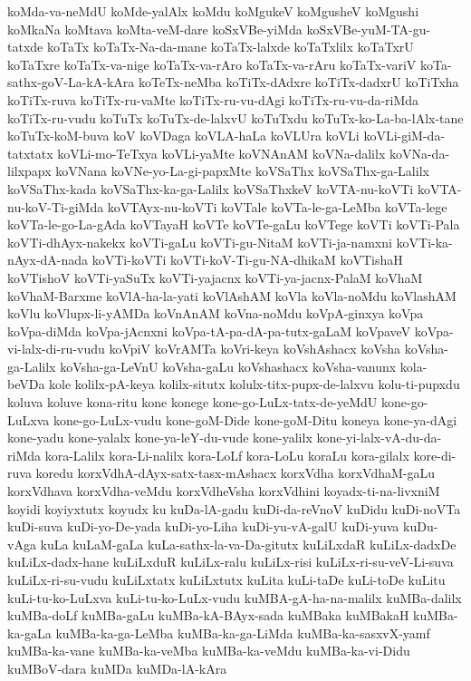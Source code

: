 {koMda-va-neMdU
koMde-yalAlx
koMdu
koMgukeV
koMgusheV
koMgushi
koMkaNa
koMtava
koMta-veM-dare
koSxVBe-yiMda
koSxVBe-yuM-TA-gu-tatxde
koTaTx
koTaTx-Na-da-mane
koTaTx-lalxde
koTaTxlilx
koTaTxrU
koTaTxre
koTaTx-va-nige
koTaTx-va-rAro
koTaTx-va-rAru
koTaTx-variV
koTa-sathx-goV-La-kA-kAra
koTeTx-neMba
koTiTx-dAdxre
koTiTx-dadxrU
koTiTxha
koTiTx-ruva
koTiTx-ru-vaMte
koTiTx-ru-vu-dAgi
koTiTx-ru-vu-da-riMda
koTiTx-ru-vudu
koTuTx
koTuTx-de-lalxvU
koTuTxdu
koTuTx-ko-La-ba-lAlx-tane
koTuTx-koM-buva
koV
koVDaga
koVLA-haLa
koVLUra
koVLi
koVLi-giM-da-tatxtatx
koVLi-mo-TeTxya
koVLi-yaMte
koVNAnAM
koVNa-dalilx
koVNa-da-lilxpapx
koVNana
koVNe-yo-La-gi-papxMte
koVSaThx
koVSaThx-ga-Lalilx
koVSaThx-kada
koVSaThx-ka-ga-Lalilx
koVSaThxkeV
koVTA-nu-koVTi
koVTA-nu-koV-Ti-giMda
koVTAyx-nu-koVTi
koVTale
koVTa-le-ga-LeMba
koVTa-lege
koVTa-le-go-La-gAda
koVTayaH
koVTe
koVTe-gaLu
koVTege
koVTi
koVTi-Pala
koVTi-dhAyx-nakekx
koVTi-gaLu
koVTi-gu-NitaM
koVTi-ja-namxni
koVTi-ka-nAyx-dA-nada
koVTi-koVTi
koVTi-koV-Ti-gu-NA-dhikaM
koVTishaH
koVTishoV
koVTi-yaSuTx
koVTi-yajacnx
koVTi-ya-jacnx-PalaM
koVhaM
koVhaM-Barxme
koVlA-ha-la-yati
koVlAshAM
koVla
koVla-noMdu
koVlashAM
koVlu
koVlupx-li-yAMDa
koVnAnAM
koVna-noMdu
koVpA-ginxya
koVpa
koVpa-diMda
koVpa-jAcnxni
koVpa-tA-pa-dA-pa-tutx-gaLaM
koVpaveV
koVpa-vi-lalx-di-ru-vudu
koVpiV
koVrAMTa
koVri-keya
koVshAshacx
koVsha
koVsha-ga-Lalilx
koVsha-ga-LeVnU
koVsha-gaLu
koVshashacx
koVsha-vanunx
kola-beVDa
kole
kolilx-pA-keya
kolilx-situtx
kolulx-titx-pupx-de-lalxvu
kolu-ti-pupxdu
koluva
koluve
kona-ritu
kone
konege
kone-go-LuLx-tatx-de-yeMdU
kone-go-LuLxva
kone-go-LuLx-vudu
kone-goM-Dide
kone-goM-Ditu
koneya
kone-ya-dAgi
kone-yadu
kone-yalalx
kone-ya-leY-du-vude
kone-yalilx
kone-yi-lalx-vA-du-da-riMda
kora-Lalilx
kora-Li-nalilx
kora-LoLf
kora-LoLu
koraLu
kora-gilalx
kore-di-ruva
koredu
korxVdhA-dAyx-satx-tasx-mAshacx
korxVdha
korxVdhaM-gaLu
korxVdhava
korxVdha-veMdu
korxVdheVsha
korxVdhini
koyadx-ti-na-livxniM
koyidi
koyiyxtutx
koyudx
ku
kuDa-lA-gadu
kuDi-da-reVnoV
kuDidu
kuDi-noVTa
kuDi-suva
kuDi-yo-De-yada
kuDi-yo-Liha
kuDi-yu-vA-galU
kuDi-yuva
kuDu-vAga
kuLa
kuLaM-gaLa
kuLa-sathx-la-va-Da-gitutx
kuLiLxdaR
kuLiLx-dadxDe
kuLiLx-dadx-hane
kuLiLxduR
kuLiLx-ralu
kuLiLx-risi
kuLiLx-ri-su-veV-Li-suva
kuLiLx-ri-su-vudu
kuLiLxtatx
kuLiLxtutx
kuLita
kuLi-taDe
kuLi-toDe
kuLitu
kuLi-tu-ko-LuLxva
kuLi-tu-ko-LuLx-vudu
kuMBA-gA-ha-na-malilx
kuMBa-dalilx
kuMBa-doLf
kuMBa-gaLu
kuMBa-kA-BAyx-sada
kuMBaka
kuMBakaH
kuMBa-ka-gaLa
kuMBa-ka-ga-LeMba
kuMBa-ka-ga-LiMda
kuMBa-ka-sasxvX-yamf
kuMBa-ka-vane
kuMBa-ka-veMba
kuMBa-ka-veMdu
kuMBa-ka-vi-Didu
kuMBoV-dara
kuMDa
kuMDa-lA-kAra
}
